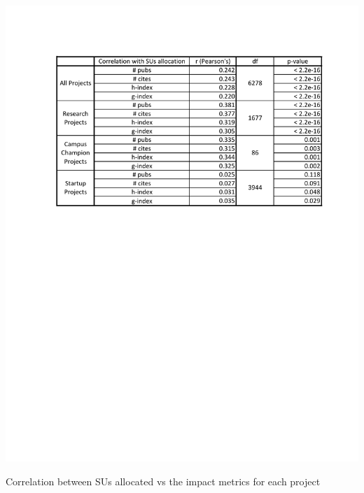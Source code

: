\documentclass{sig-alternate}
\begin{document}
 
 
\begin{table}[!htb] 
  \centering 
    \includegraphics[width=1.0\columnwidth]{images/metrics_alloc_r.pdf} 
  \caption{Correlation between SUs allocated vs the impact metrics for each project}\label{F:metrics-alloc-r} 
\end{table} 
 
\end{document}
